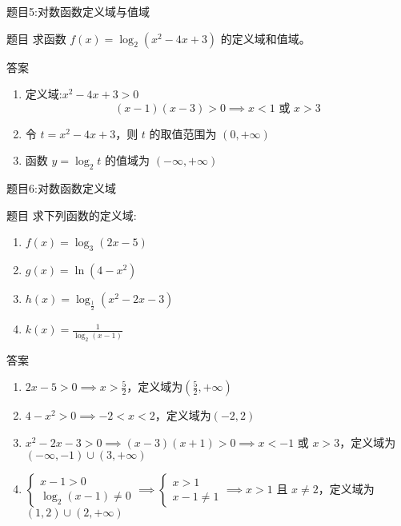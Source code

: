   
  \begin{frame}{题目5:对数函数定义域与值域}
    \begin{block}{题目}
        求函数 $f(x) = \log_2 (x^2 - 4x + 3)$ 的定义域和值域。
    \end{block}
    
    \pause
    
    \begin{block}{答案}
        \begin{enumerate}
            \item 定义域:$x^2 - 4x + 3 > 0$
                  \[
                  (x - 1)(x - 3) > 0 \implies x < 1 \text{ 或 } x > 3
                  \]
            \item 令 $t = x^2 - 4x + 3$，则 $t$ 的取值范围为 $(0, +\infty)$
            \item 函数 $y = \log_2 t$ 的值域为 $(-\infty, +\infty)$
        \end{enumerate}
    \end{block}
  \end{frame}
  
  \begin{frame}[allowframebreaks]{题目6:对数函数定义域}
    \begin{block}{题目}
        求下列函数的定义域:
        \begin{enumerate}
            \item $f(x) = \log_3(2x - 5)$
            \item $g(x) = \ln(4 - x^2)$
            \item $h(x) = \log_{\frac{1}{2}}(x^2 - 2x - 3)$
            \item $k(x) = \frac{1}{\log_2(x - 1)}$
        \end{enumerate}
    \end{block}
    
    \pause
    
    \begin{block}{答案}
        \begin{enumerate}
            \item $2x - 5 > 0 \implies x > \frac{5}{2}$，定义域为$\left(\frac{5}{2}, +\infty\right)$
            \item $4 - x^2 > 0 \implies -2 < x < 2$，定义域为$(-2, 2)$
            \item $x^2 - 2x - 3 > 0 \implies (x - 3)(x + 1) > 0 \implies x < -1 \text{ 或 } x > 3$，定义域为$(-\infty, -1) \cup (3, +\infty)$
            \item $\begin{cases} x - 1 > 0 \\ \log_2(x - 1) \neq 0 \end{cases} \implies \begin{cases} x > 1 \\ x - 1 \neq 1 \end{cases} \implies x > 1 \text{ 且 } x \neq 2$，定义域为$(1, 2) \cup (2, +\infty)$
        \end{enumerate}
    \end{block}
  \end{frame}
  